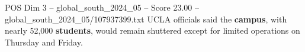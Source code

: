 \begin{textsample}{POS Dim 3 – global\_south\_2024\_05 – Score 23.00 – global\_south\_2024\_05/107937399.txt}
UCLA officials said the \textbf{campus}, with nearly 52,000 \textbf{students}, would remain shuttered except for limited operations on Thursday and Friday.

\end{textsample}
